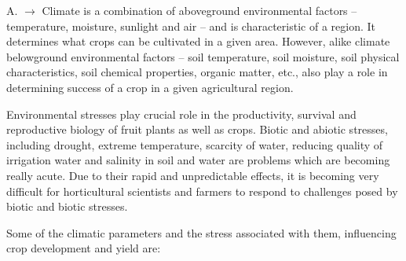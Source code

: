 \documentclass[]{book}
\begin{document}
A. \(\longrightarrow\) Climate is a combination of aboveground environmental factors -- temperature, moisture, sunlight and air -- and is characteristic of a region. It determines what crops can be cultivated in a given area. However, alike climate belowground environmental factors -- soil temperature, soil moisture, soil physical characteristics, soil chemical properties, organic matter, etc., also play a role in determining success of a crop in a given agricultural region.

Environmental stresses play crucial role in the productivity, survival and reproductive biology of fruit plants as well as crops. Biotic and abiotic stresses, including drought, extreme temperature, scarcity of water, reducing quality of irrigation water and salinity in soil and water are problems which are becoming really acute. Due to their rapid and unpredictable effects, it is becoming very difficult for horticultural scientists and farmers to respond to challenges posed by biotic and biotic stresses.

Some of the climatic parameters and the stress associated with them, influencing crop development and yield are:
\end{document}

